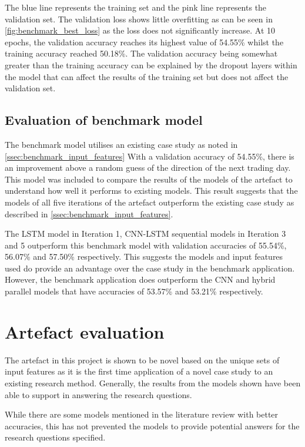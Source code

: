 The blue line represents the training set and the pink line represents
the validation set. The validation loss shows little overfitting as can be seen in
\autoref{fig:benchmark_best_loss} as the loss does not significantly increase. At 10 epochs,
the validation accuracy reaches its highest value of 54.55\% whilst the training accuracy reached 50.18\%. The validation accuracy being somewhat greater than the
training accuracy can be explained by the dropout layers within the model that can affect the results of the training
set but does not affect the validation set.


\subsection{Evaluation of benchmark model}
The benchmark model utilises an existing case study as noted in \autoref{ssec:benchmark_input_features}
With a validation accuracy of 54.55\%, there is an improvement above a random guess of the direction
of the next trading day. This model was included to compare the results of the models of the artefact to understand
how well it performs to existing models.  This result suggests that the models of all five iterations of the artefact
outperform the existing case study as described in \autoref{ssec:benchmark_input_features}.

The LSTM model in Iteration 1, CNN-LSTM sequential models in Iteration 3 and 5 outperform this benchmark model
with validation accuracies of 55.54\%, 56.07\% and 57.50\% respectively. This suggests the models and input features
used do provide an advantage over the case study in the benchmark application. However, the benchmark
application does outperform the CNN and hybrid parallel models that have accuracies of 53.57\% and 53.21\%
respectively.

\section{Artefact evaluation}
The artefact in this project is shown to be novel based on the unique sets of input features as
it is the first time application of a novel case study to an existing research method. Generally,
the results from the models shown have been able to support in answering the research questions.

While there are some models mentioned in the literature review with better accuracies, this has not
prevented the models to provide potential answers for the research questions specified.

